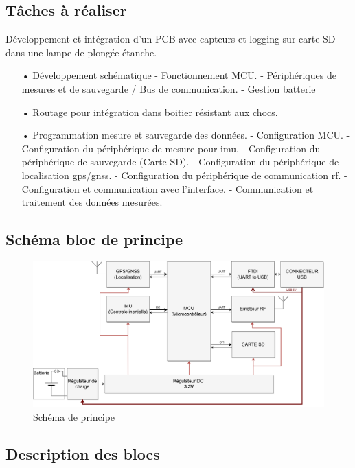 \subsection{Tâches à réaliser}
Développement et intégration d’un PCB avec capteurs et logging sur carte SD dans une lampe de plongée étanche.
\begin{itemize}
	\item[•] Développement schématique 
	\subitem- Fonctionnement MCU.
	\subitem-	Périphériques de mesures et de sauvegarde / Bus de communication.
	\subitem-	Gestion batterie 
	\item[•]	Routage pour intégration dans boitier résistant aux chocs.
	\item[•]	Programmation mesure et sauvegarde des données.
	\subitem-	Configuration MCU.
	\subitem-	Configuration du périphérique de mesure pour \gls{imu}.
	\subitem-	Configuration du périphérique de sauvegarde (Carte SD).
	\subitem-	Configuration du périphérique de localisation \gls{gps}/\gls{gnss}.
	\subitem-	Configuration du périphérique de communication \gls{rf}.
	\subitem-	Configuration et communication avec l'interface.
	\subitem-	Communication et traitement des données mesurées.
\end{itemize}

\subsection{Schéma bloc de principe}
\begin{figure}[h]
	\centering
	\includegraphics[width=1\textwidth]{../figures/cdc/blocs_grossiers}
	\caption{Schéma de principe}
	\label{fig:blocsgrossiers}
\end{figure}


\subsection{Description des blocs}


